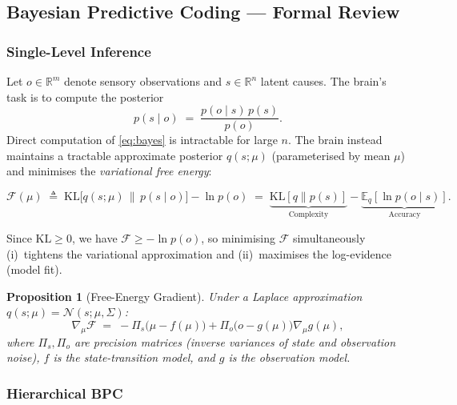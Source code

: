 \documentclass[12pt,a4paper]{article}
\theoremstyle{plain}
\newtheorem{proposition}[theorem]{Proposition}
\theoremstyle{definition}
\theoremstyle{remark}
\newcommand{\vF}{\mathcal{F}}
\newcommand{\KL}{\mathrm{KL}}
\newcommand{\E}{\mathbb{E}}
\newcommand{\R}{\mathbb{R}}
\begin{document}
\subsection{Bayesian Predictive Coding — Formal Review}

\subsubsection{Single-Level Inference}

Let $o \in \R^m$ denote sensory observations and $s \in \R^n$ latent causes.
The brain's task is to compute the posterior
\begin{equation}
  p(s \mid o) \;=\; \frac{p(o \mid s)\,p(s)}{p(o)}.
  \label{eq:bayes}
\end{equation}
Direct computation of \cref{eq:bayes} is intractable for large $n$.
The brain instead maintains a tractable approximate posterior $q(s;\mu)$
(parameterised by mean $\mu$) and minimises the \emph{variational free energy}:

\begin{tcolorbox}[mathbox, title={Definition 3.1 — Variational Free Energy}]
\begin{equation}
  \vF(\mu) \;\triangleq\; \KL\bigl[q(s;\mu) \,\|\, p(s \mid o)\bigr] - \ln p(o)
           \;=\; \underbrace{\KL[q \| p(s)]}_{\text{Complexity}} -
                 \underbrace{\E_q[\ln p(o \mid s)]}_{\text{Accuracy}}.
  \label{eq:free_energy}
\end{equation}
\end{tcolorbox}

Since $\KL \geq 0$, we have $\vF \geq -\ln p(o)$, so minimising $\vF$ simultaneously
(i)~tightens the variational approximation and (ii)~maximises the log-evidence (model fit).

\begin{proposition}[Free-Energy Gradient]
Under a Laplace approximation $q(s;\mu) = \mathcal{N}(s;\mu, \Sigma)$:
\begin{equation}
  \nabla_\mu \vF \;=\; -\Pi_s\bigl(\mu - f(\mu)\bigr) + \Pi_o\bigl(o - g(\mu)\bigr)\nabla_\mu g(\mu),
\end{equation}
where $\Pi_s,\Pi_o$ are precision matrices (inverse variances of state and observation noise),
$f$ is the state-transition model, and $g$ is the observation model.
\end{proposition}

\subsubsection{Hierarchical BPC}
\end{document}
